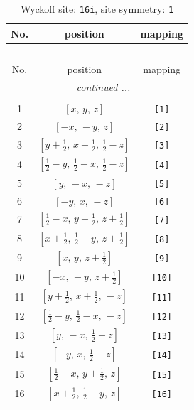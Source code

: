 \documentclass[fleqn,8pt]{jsarticle}
\begin{document}
\begin{longtable}{ccc}
\caption{Wyckoff site: {\tt 16i}, site symmetry: {\tt 1}}
 \\
 \hline \hline
No. & position & mapping \\ \hline \endfirsthead

\multicolumn{2}{l}{\tablename\ \thetable{}} \\
 \hline \hline
No. & position & mapping \\ \hline \endhead

 \hline \hline
\multicolumn{2}{r}{\footnotesize\it continued ...} \\ \endfoot

 \hline \hline
\multicolumn{2}{r}{} \\ \endlastfoot

1 & $\left[ x,\, y,\, z \right]$ & {\tt [1]} \\ \hline
2 & $\left[ - x,\, - y,\, z \right]$ & {\tt [2]} \\ \hline
3 & $\left[ y + \frac{1}{2},\, x + \frac{1}{2},\, \frac{1}{2} - z \right]$ & {\tt [3]} \\ \hline
4 & $\left[ \frac{1}{2} - y,\, \frac{1}{2} - x,\, \frac{1}{2} - z \right]$ & {\tt [4]} \\ \hline
5 & $\left[ y,\, - x,\, - z \right]$ & {\tt [5]} \\ \hline
6 & $\left[ - y,\, x,\, - z \right]$ & {\tt [6]} \\ \hline
7 & $\left[ \frac{1}{2} - x,\, y + \frac{1}{2},\, z + \frac{1}{2} \right]$ & {\tt [7]} \\ \hline
8 & $\left[ x + \frac{1}{2},\, \frac{1}{2} - y,\, z + \frac{1}{2} \right]$ & {\tt [8]} \\ \hline
9 & $\left[ x,\, y,\, z + \frac{1}{2} \right]$ & {\tt [9]} \\ \hline
10 & $\left[ - x,\, - y,\, z + \frac{1}{2} \right]$ & {\tt [10]} \\ \hline
11 & $\left[ y + \frac{1}{2},\, x + \frac{1}{2},\, - z \right]$ & {\tt [11]} \\ \hline
12 & $\left[ \frac{1}{2} - y,\, \frac{1}{2} - x,\, - z \right]$ & {\tt [12]} \\ \hline
13 & $\left[ y,\, - x,\, \frac{1}{2} - z \right]$ & {\tt [13]} \\ \hline
14 & $\left[ - y,\, x,\, \frac{1}{2} - z \right]$ & {\tt [14]} \\ \hline
15 & $\left[ \frac{1}{2} - x,\, y + \frac{1}{2},\, z \right]$ & {\tt [15]} \\ \hline
16 & $\left[ x + \frac{1}{2},\, \frac{1}{2} - y,\, z \right]$ & {\tt [16]} \\
\end{longtable}
\end{document}
